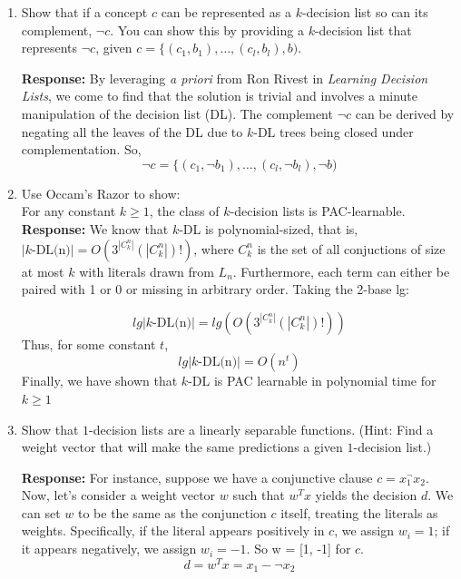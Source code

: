 \begin{enumerate}
\item \relax[8 points] Show that if a concept $c$ can be represented
  as a $k$-decision list so can its complement, $\neg c$. You can show
  this by providing a $k$-decision list that represents $\neg c$,
  given $c = \{(c_{1},b_{1}), \ldots, (c_{l},b_{l}),b)$.

	\textbf{Response:} By leveraging \textit{a priori} from Ron Rivest in \textit{Learning Decision Lists}, we come to find that the solution is trivial and involves a minute manipulation of the decision list (DL). The complement $\neg c$ can be derived by negating all the leaves of the DL due to $k$-DL trees being closed under complementation. So, $$\neg c = \{(c_{1},\neg b_{1}), \ldots, (c_{l},\neg b_{l}),\neg b)$$

\item \relax[9 points] Use  Occam's Razor to show: \\
  For any constant $k \geq 1$, the class of $k$-decision lists is
  PAC-learnable. \newline\newline
  \textbf{Response:} We know that $k$-DL is polynomial-sized, that is, $|k \text{-DL(n)}|=O(3^{|C^n _k|}(|C^n _k|)!)$, where $C^n _k$ is the set of all conjuctions of size at most $k$ with literals drawn from $L_n$. Furthermore, each term can either be paired with 1 or 0 or missing in arbitrary order. Taking the 2-base lg:
  
  $$lg|k \text{-DL(n)}|=lg(O(3^{|C^n _k|}(|C^n _k|)!))$$
  Thus, for some constant $t$,
  $$lg|k \text{-DL(n)}|=O(n^t)$$
  Finally, we have shown that $k$-DL is PAC learnable in polynomial time for $k \geq 1$

\item \relax[8 points] Show that $1$-decision lists are a linearly
  separable functions. (Hint: Find a weight vector that will make the
  same predictions a given $1$-decision list.) \newline
  
  \textbf{Response:} For instance, suppose we have a conjunctive clause $c = x_1 ^ \neg x_2$. Now, let's consider a weight vector $w$ such that $w^T x$ yields the decision $d$. We can set $w$ to be the same as the conjunction $c$ itself, treating the literals as weights. Specifically, if the literal appears positively in $c$, we assign $w_i=1$; if it appears negatively, we assign $w_i=-1$. So w = [1, -1] for $c$. $$d = w^T x=x_1 - \neg x_2$$
	
\end{enumerate}


